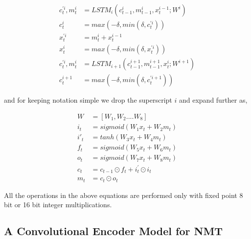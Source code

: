 \documentclass[a4paper]{article}
\begin{document}
\begin{equation}
  \begin{split}
    c^{'i}_t,m^i_t & = LSTM_i(c^{i}_{t-1},m^i_{t-1}, x^{i-1}_t; W^i ) \\
    c^{i}_t & = max(-\delta, min(\delta,c^{'i}_t )) \\
    x^{'i}_t & = m^{i}_t + x^{i-1}_t \\
    x^{i}_t & =  max(-\delta, min(\delta,x^{'i}_t )) \\
    c^{'i}_t,m^i_t & = LSTM_{i+1}(c^{i+1}_{t-1},
                       m^{i+1}_{t-1}, x^{i}_t; W^{i+1} ) \\
    c^{i+1}_t & =  max(-\delta, min(\delta,c^{'i+1}_t ))
  \end{split}
\end{equation}


and for keeping notation simple we drop the superscript $i$ and expand further as,


\begin{equation}
  \begin{split}
    W & = [W_1,W_2....W_8] \\
    i_t & =  sigmoid (W_1x_t + W_2m_t) \\
    {i'}_t & = tanh(W_3x_t + W_4m_t) \\
    f_t & =  sigmoid (W_5x_t + W_6m_t) \\
    o_t & = sigmoid (W_7x_t + W_8m_t) \\
    c_t & =  c_{t-1} \odot f_t + i^{'}_t \odot i_t \\
    m_t & = c_t \odot o_t
  \end{split}
\end{equation}


All the operations in the above equations are performed only with fixed point  8
bit or 16 bit integer multiplications.


\subsection{A Convolutional Encoder Model for NMT}
\end{document}
